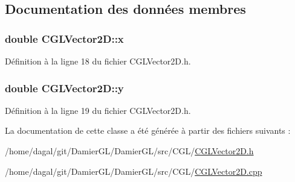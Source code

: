 \subsection{Documentation des données membres}
\hypertarget{class_c_g_l_vector2_d_adca68a6660d264b4fcb312c881c57861}{
\subsubsection[{x}]{\setlength{\rightskip}{0pt plus 5cm}double C\-G\-L\-Vector2\-D\-::x\hspace{0.3cm}{\ttfamily [protected]}}}\label{class_c_g_l_vector2_d_adca68a6660d264b4fcb312c881c57861}


Définition à la ligne 18 du fichier C\-G\-L\-Vector2\-D.\-h.

\hypertarget{class_c_g_l_vector2_d_a36a88cf9827f308a125e51164c73e21f}{
\subsubsection[{y}]{\setlength{\rightskip}{0pt plus 5cm}double C\-G\-L\-Vector2\-D\-::y\hspace{0.3cm}{\ttfamily [protected]}}}\label{class_c_g_l_vector2_d_a36a88cf9827f308a125e51164c73e21f}


Définition à la ligne 19 du fichier C\-G\-L\-Vector2\-D.\-h.



La documentation de cette classe a été générée à partir des fichiers suivants \-:\begin{DoxyCompactItemize}
\item 
/home/dagal/git/\-Damier\-G\-L/\-Damier\-G\-L/src/\-C\-G\-L/\hyperlink{_c_g_l_vector2_d_8h}{C\-G\-L\-Vector2\-D.\-h}\item 
/home/dagal/git/\-Damier\-G\-L/\-Damier\-G\-L/src/\-C\-G\-L/\hyperlink{_c_g_l_vector2_d_8cpp}{C\-G\-L\-Vector2\-D.\-cpp}\end{DoxyCompactItemize}
